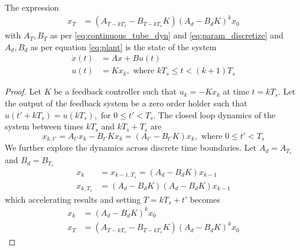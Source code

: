 \documentclass[sigconf]{llncs}
\newcommand{\mat}[1]{{#1}}
\renewcommand{\vec}[1]{{#1}}
\begin{document}
\begin{theorem}
The expression
 \begin{align}
 \vec{x}_{T} &= (\mat{A}_{T-kT_s}-\mat{B}_{T-kT_s}\mat{K}) (\mat{A}_d-\mat{B}_d\mat{K})^k\vec{x}_0
 \label{eq:cyber_feedback}
 \end{align}
 with $\mat{A}_T, \mat{B}_T$ as per \eqref{eq:continuous_tube_dyn} and \eqref{eq:param_discretize} and $\mat{A}_d, \mat{B}_d$ as per equation \eqref{eq:plant} is the state of the system
 \begin{align*}
 \dot{\vec{x}}({t}) &= \mat{A}\vec{x}+\mat{B}\vec{u}(t)\nonumber\\
 \vec{u}(t)&=\mat{K}\vec{x}_k, \text{ where }  kT_s \leq t < (k+1)T_s
 \end{align*}
 \end{theorem}

\begin{proof}
Let $\mat{K}$ be a feedback controller such that $\vec{u}_k=-\mat{K}\vec{x}_k$ at time $t=kT_s$. Let the output of
the feedback system be a zero order holder such that $\vec{u}(t'+kT_s)=\vec{u}(kT_s), \text{ for }  0 \leq t' < T_s$.
The closed loop dynamics of the system between times $kT_s$ and $kT_s+T_s$ are
\begin{equation*}
\vec{x}_{k,t'}=\mat{A}_{t'}\vec{x}_k-\mat{B}_{t'}\mat{K}\vec{x}_k = (\mat{A}_{t'}-\mat{B}_{t'}\mat{K})\vec{x}_k, \text{ where }  0 \leq t' < T_s
\end{equation*}
We further explore the dynamics across discrete time boundaries. Let $\mat{A}_d=\mat{A}_{T_s}$ and $\mat{B}_d=\mat{B}_{T_s}$
\begin{align*}
\vec{x}_{k}&=\vec{x}_{k-1,T_s}= (\mat{A}_d-\mat{B}_d\mat{K})\vec{x}_{k-1}\\
\vec{x}_{k,T_s} &= (\mat{A}_d-\mat{B}_d\mat{K}) (\mat{A}_d-\mat{B}_d\mat{K})\vec{x}_{k-1}
\end{align*}
which accelerating results and setting $T=kT_s+t'$ becomes
\begin{align}
\label{eq:feedback_sampled_cont}
\vec{x}_{k} &= (\mat{A}_d-\mat{B}_d\mat{K}) ^k\vec{x}_0\\
\vec{x}_{T} &= (\mat{A}_{T-kT_s}-\mat{B}_{T-kT_s}\mat{K}) (\mat{A}_d-\mat{B}_d\mat{K})^k\vec{x}_0
\label{eq:feedback_cont}
\end{align}
\end{proof}

\end{document}

